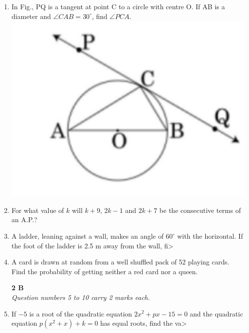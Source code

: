 \documentclass[12pt,a4paper]{article}
\begin{document}
\begin{multicols}{2}

\begin{enumerate}

    \item In Fig., PQ is a tangent at point C to a circle with centre O. If AB is a diameter and $\angle CAB = 30^\circ$, find $\angle PCA$.\\
    \includegraphics[width=\linewidth]{circle_diagram.png}

    \item For what value of $k$ will $k+9$, $2k-1$ and $2k+7$ be the consecutive terms of an A.P.?

    \item A ladder, leaning against a wall, makes an angle of $60^\circ$ with the horizontal. If the foot of the ladder is 2.5 m away from the wall, fi>

    \item A card is drawn at random from a well shuffled pack of 52 playing cards. Find the probability of getting neither a red card nor a queen.

    \columnbreak

    \begin{center}
    \textbf{2 B} \\
    \textit{Question numbers 5 to 10 carry 2 marks each.}
    \end{center}

    \item If $-5$ is a root of the quadratic equation $2x^2 + px - 15 = 0$ and the quadratic equation $p(x^2 + x) + k = 0$ has equal roots, find the va>


\end{enumerate}
\end{multicols}
\end{document}
